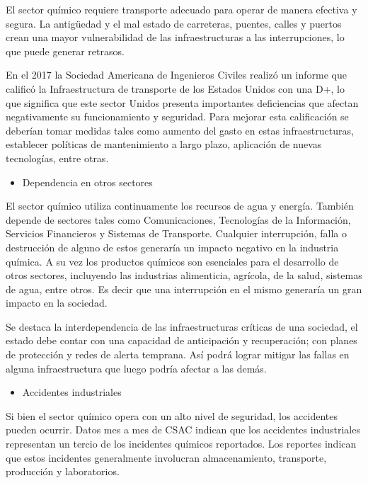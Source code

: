 \documentclass{article}
\providecommand{\tightlist}{%
  \setlength{\itemsep}{0pt}\setlength{\parskip}{0pt}}
\begin{document}
El sector químico requiere transporte adecuado para operar de manera
efectiva y segura. La antigüedad y el mal estado de carreteras, puentes,
calles y puertos crean una mayor vulnerabilidad de las infraestructuras
a las interrupciones, lo que puede generar retrasos.

En el 2017 la Sociedad Americana de Ingenieros Civiles realizó un
informe que calificó la Infraestructura de transporte de los Estados
Unidos con una D+, lo que significa que este sector Unidos presenta
importantes deficiencias que afectan negativamente su funcionamiento y
seguridad. Para mejorar esta calificación se deberían tomar medidas
tales como aumento del gasto en estas infraestructuras, establecer
políticas de mantenimiento a largo plazo, aplicación de nuevas
tecnologías, entre otras.

\begin{itemize}
\tightlist
\item
  Dependencia en otros sectores
\end{itemize}

El sector químico utiliza continuamente los recursos de agua y energía.
También depende de sectores tales como Comunicaciones, Tecnologías de la
Información, Servicios Financieros y Sistemas de Transporte. Cualquier
interrupción, falla o destrucción de alguno de estos generaría un
impacto negativo en la industria química. A su vez los productos
químicos son esenciales para el desarrollo de otros sectores, incluyendo
las industrias alimenticia, agrícola, de la salud, sistemas de agua,
entre otros. Es decir que una interrupción en el mismo generaría un gran
impacto en la sociedad.

Se destaca la interdependencia de las infraestructuras críticas de una
sociedad, el estado debe contar con una capacidad de anticipación y
recuperación; con planes de protección y redes de alerta temprana. Así
podrá lograr mitigar las fallas en alguna infraestructura que luego
podría afectar a las demás.

\begin{itemize}
\tightlist
\item
  Accidentes industriales
\end{itemize}

Si bien el sector químico opera con un alto nivel de seguridad, los
accidentes pueden ocurrir. Datos mes a mes de CSAC indican que los
accidentes industriales representan un tercio de los incidentes químicos
reportados. Los reportes indican que estos incidentes generalmente
involucran almacenamiento, transporte, producción y laboratorios.
\end{document}
